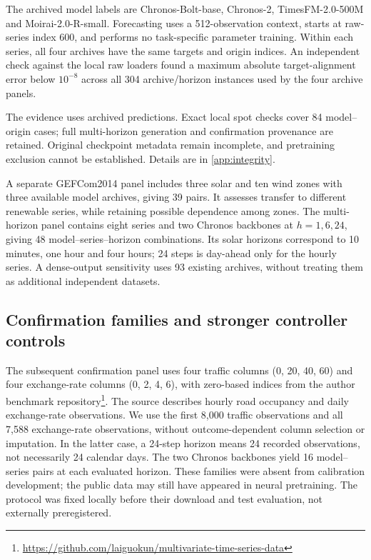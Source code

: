 \documentclass[preprint,11pt]{elsarticle}
\begin{document}
The archived model labels are Chronos-Bolt-base, Chronos-2, TimesFM-2.0-500M and
Moirai-2.0-R-small. Forecasting uses a 512-observation context, starts at raw-series index
600, and performs no task-specific parameter training. Within each series, all four
archives have the same targets and origin indices. An independent check against the
local raw loaders found a maximum absolute target-alignment error below $10^{-8}$ across
all 304 archive/horizon instances used by the four archive panels.

The evidence uses archived predictions. Exact local spot checks cover 84 model--origin
cases; full multi-horizon generation and confirmation provenance are retained.
Original checkpoint metadata remain incomplete, and pretraining exclusion cannot
be established. Details are in \ref{app:integrity}.

A separate GEFCom2014 panel \citep{hong2016gefcom2014} includes three solar and ten wind
zones with three available model archives, giving 39 pairs. It assesses transfer to
different renewable series, while retaining possible dependence among zones. The
multi-horizon panel contains eight series and two Chronos backbones at $h=1,6,24$, giving
48 model--series--horizon combinations. Its solar horizons correspond to 10 minutes,
one hour and four hours; 24 steps is day-ahead only for the hourly series. A dense-output
sensitivity uses 93 existing archives, without treating them as additional independent
datasets.

\subsection{Confirmation families and stronger controller controls}\label{sec:confirmationdesign}
The subsequent confirmation panel uses four traffic columns (0, 20, 40, 60) and four
exchange-rate columns (0, 2, 4, 6), with zero-based indices from the author benchmark
repository\footnote{\url{https://github.com/laiguokun/multivariate-time-series-data}}.
The source describes hourly road occupancy and daily exchange-rate observations.
We use the first 8,000 traffic observations and all 7,588 exchange-rate observations,
without outcome-dependent column selection or imputation. In the latter case, a
24-step horizon means 24 recorded observations, not necessarily 24 calendar days.
The two Chronos backbones yield 16 model--series pairs at each evaluated horizon.
These families were absent from calibration development; the public data may still
have appeared in neural pretraining. The protocol was fixed locally before their
download and test evaluation, not externally preregistered.
\end{document}
